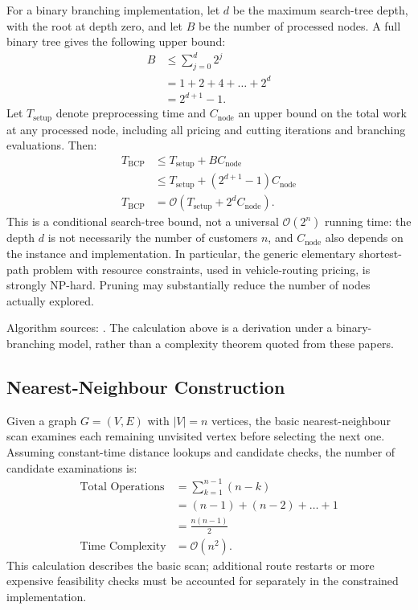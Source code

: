 \documentclass[11pt]{article}
\begin{document}
\begin{appendices}
For a binary branching implementation, let $d$ be the maximum search-tree depth, with the root at depth zero, and let $B$ be the number of processed nodes. A full binary tree gives the following upper bound:
\[
\begin{aligned}
    B &\le \sum_{j=0}^{d} 2^j \\
      &= 1+2+4+\dots+2^d \\
      &= 2^{d+1}-1.
\end{aligned}
\]
Let $T_{\text{setup}}$ denote preprocessing time and $C_{\text{node}}$ an upper bound on the total work at any processed node, including all pricing and cutting iterations and branching evaluations. Then:
\[
\begin{aligned}
    T_{\text{BCP}} &\le T_{\text{setup}}+B C_{\text{node}} \\
    &\le T_{\text{setup}}+(2^{d+1}-1)C_{\text{node}} \\[0.5em]
    T_{\text{BCP}} &= \mathcal{O}\!\left(T_{\text{setup}}+2^d C_{\text{node}}\right).
\end{aligned}
\]
This is a conditional search-tree bound, not a universal $\mathcal{O}(2^n)$ running time: the depth $d$ is not necessarily the number of customers $n$, and $C_{\text{node}}$ also depends on the instance and implementation. In particular, the generic elementary shortest-path problem with resource constraints, used in vehicle-routing pricing, is strongly NP-hard.\parencite{irnich2006shortest_path} Pruning may substantially reduce the number of nodes actually explored.

Algorithm sources: \textcite{pecin2017improved_bcp,pessoa2020generic_vrp}. The calculation above is a derivation under a binary-branching model, rather than a complexity theorem quoted from these papers.

\subsection{Nearest-Neighbour Construction}
\label{app:complexity_nn}
Given a graph $G = (V, E)$ with $\lvert V\rvert = n$ vertices, the basic nearest-neighbour scan examines each remaining unvisited vertex before selecting the next one. Assuming constant-time distance lookups and candidate checks, the number of candidate examinations is:
\[
\begin{aligned}
    \text{Total Operations} &= \sum_{k=1}^{n-1} (n - k) \\
    &= (n - 1) + (n - 2) + \dots + 1 \\
    &= \frac{n(n - 1)}{2} \\[0.5em]
    \text{Time Complexity} &= \mathcal{O}(n^2).
\end{aligned}
\]
This calculation describes the basic scan; additional route restarts or more expensive feasibility checks must be accounted for separately in the constrained implementation.


\end{appendices}
\end{document}
